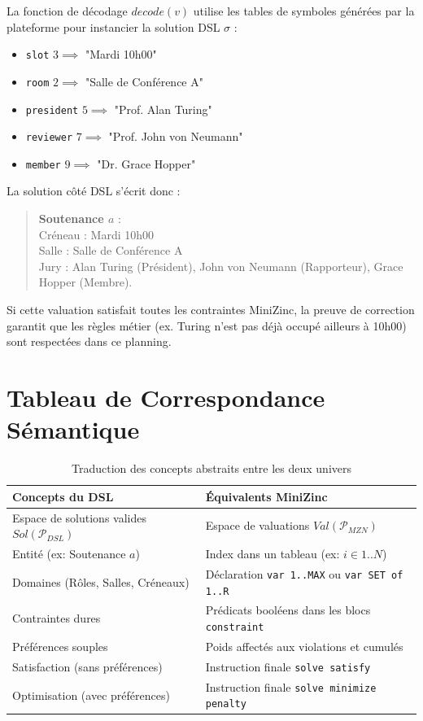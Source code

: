\documentclass[12pt,a4paper]{article}
\begin{document}
La fonction de décodage $decode(v)$ utilise les tables de symboles générées par la plateforme pour instancier la solution DSL $\sigma$ :
\begin{itemize}
    \item \texttt{slot} $3 \implies$ "Mardi 10h00"
    \item \texttt{room} $2 \implies$ "Salle de Conférence A"
    \item \texttt{president} $5 \implies$ "Prof. Alan Turing"
    \item \texttt{reviewer} $7 \implies$ "Prof. John von Neumann"
    \item \texttt{member} $9 \implies$ "Dr. Grace Hopper"
\end{itemize}

La solution côté DSL s'écrit donc :
\begin{quote}
\textbf{Soutenance $a$} : \\
Créneau : Mardi 10h00 \\
Salle : Salle de Conférence A \\
Jury : Alan Turing (Président), John von Neumann (Rapporteur), Grace Hopper (Membre).
\end{quote}
Si cette valuation satisfait toutes les contraintes MiniZinc, la preuve de correction garantit que les règles métier (ex. Turing n'est pas déjà occupé ailleurs à 10h00) sont respectées dans ce planning.

\section{Tableau de Correspondance Sémantique}

\begin{table}[ht]
\centering
\begin{tabular}{@{}ll@{}}
\toprule
\textbf{Concepts du DSL} & \textbf{Équivalents MiniZinc} \\ \midrule
Espace de solutions valides $Sol(\mathcal{P}_{DSL})$ & Espace de valuations $Val(\mathcal{P}_{MZN})$ \\
Entité (ex: Soutenance $a$) & Index dans un tableau (ex: $i \in 1..N$) \\
Domaines (Rôles, Salles, Créneaux) & Déclaration \texttt{var 1..MAX} ou \texttt{var SET of 1..R} \\
Contraintes dures & Prédicats booléens dans les blocs \texttt{constraint} \\
Préférences souples & Poids affectés aux violations et cumulés \\
Satisfaction (sans préférences) & Instruction finale \texttt{solve satisfy} \\
Optimisation (avec préférences) & Instruction finale \texttt{solve minimize penalty} \\ \bottomrule
\end{tabular}
\caption{Traduction des concepts abstraits entre les deux univers}
\end{table}
\end{document}
